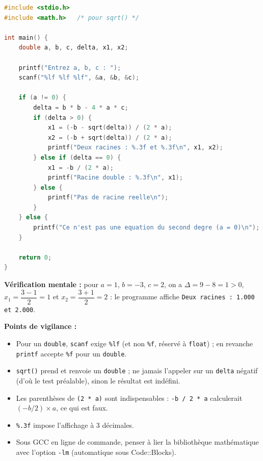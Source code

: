 \documentclass[11pt]{article}
\begin{document}
\begin{corrige}
\begin{lstlisting}[language=C]
#include <stdio.h>
#include <math.h>   /* pour sqrt() */

int main() {
    double a, b, c, delta, x1, x2;

    printf("Entrez a, b, c : ");
    scanf("%lf %lf %lf", &a, &b, &c);

    if (a != 0) {
        delta = b * b - 4 * a * c;
        if (delta > 0) {
            x1 = (-b - sqrt(delta)) / (2 * a);
            x2 = (-b + sqrt(delta)) / (2 * a);
            printf("Deux racines : %.3f et %.3f\n", x1, x2);
        } else if (delta == 0) {
            x1 = -b / (2 * a);
            printf("Racine double : %.3f\n", x1);
        } else {
            printf("Pas de racine reelle\n");
        }
    } else {
        printf("Ce n'est pas une equation du second degre (a = 0)\n");
    }

    return 0;
}
\end{lstlisting}
\textbf{Vérification mentale :} pour $a = 1$, $b = -3$, $c = 2$, on a $\Delta = 9 - 8 = 1 > 0$, $x_1 = \dfrac{3 - 1}{2} = 1$ et $x_2 = \dfrac{3 + 1}{2} = 2$ : le programme affiche \texttt{Deux racines : 1.000 et 2.000}.

\textbf{Points de vigilance :}
\begin{itemize}
    \item Pour un \texttt{double}, \texttt{scanf} exige \texttt{\%lf} (et non \texttt{\%f}, réservé à \texttt{float}) ; en revanche \texttt{printf} accepte \texttt{\%f} pour un \texttt{double}.
    \item \texttt{sqrt()} prend et renvoie un \texttt{double} ; ne jamais l'appeler sur un \texttt{delta} négatif (d'où le test préalable), sinon le résultat est indéfini.
    \item Les parenthèses de \texttt{(2 * a)} sont indispensables : \texttt{-b / 2 * a} calculerait $(-b/2)\times a$, ce qui est faux.
    \item \texttt{\%.3f} impose l'affichage à 3 décimales.
    \item Sous GCC en ligne de commande, penser à lier la bibliothèque mathématique avec l'option \texttt{-lm} (automatique sous Code::Blocks).
\end{itemize}
\end{corrige}
\end{document}
